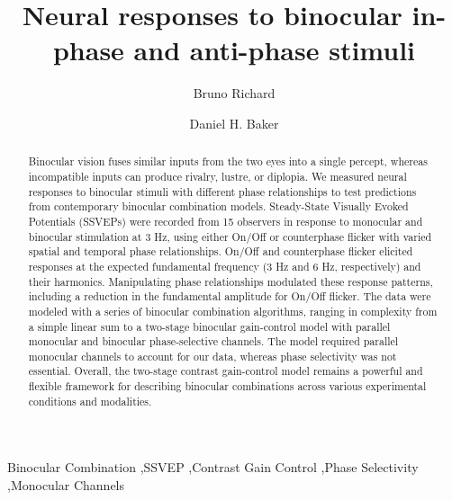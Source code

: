 \documentclass[review,
  12pt,
]{elsarticle}
\begin{document}
\begin{frontmatter}

\title{Neural responses to binocular in-phase and anti-phase stimuli}

\author[inst1]{Bruno Richard}

\author[inst2]{Daniel H. Baker}

\address[inst1]{Department of Math and Computer Sciences, Rutgers University, Newark, New Jersey, USA}
\address[inst2]{Department of Psychology, University of York, York, UK}

\begin{abstract}
Binocular vision fuses similar inputs from the two eyes into a single
percept, whereas incompatible inputs can produce rivalry, lustre, or
diplopia. We measured neural responses to binocular stimuli with
different phase relationships to test predictions from contemporary
binocular combination models. Steady-State Visually Evoked Potentials
(SSVEPs) were recorded from 15 observers in response to monocular and
binocular stimulation at 3 Hz, using either On/Off or counterphase
flicker with varied spatial and temporal phase relationships. On/Off and
counterphase flicker elicited responses at the expected fundamental
frequency (3 Hz and 6 Hz, respectively) and their harmonics.
Manipulating phase relationships modulated these response patterns,
including a reduction in the fundamental amplitude for On/Off flicker.
The data were modeled with a series of binocular combination algorithms,
ranging in complexity from a simple linear sum to a two-stage binocular
gain-control model with parallel monocular and binocular phase-selective
channels. The model required parallel monocular channels to account for
our data, whereas phase selectivity was not essential. Overall, the
two-stage contrast gain-control model remains a powerful and flexible
framework for describing binocular combinations across various
experimental conditions and modalities.
\end{abstract}

\begin{keyword}
Binocular Combination \sep SSVEP \sep Contrast Gain Control \sep Phase Selectivity \sep Monocular Channels
\end{keyword}

\end{frontmatter}


\end{document}
